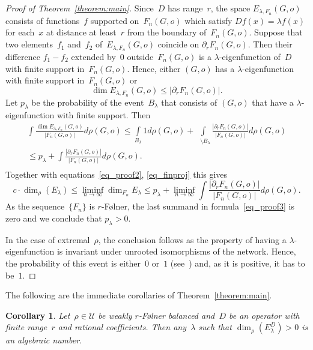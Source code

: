 \documentclass[10pt,a4paper]{amsart}
\newtheorem{corollary}[lemma]{Corollary}
\DeclareMathOperator{\Gr}{{\mathcal{G}_*}}
\begin{document}
\begin{proof}[Proof of Theorem~\ref{theorem:main}]
    Since~$D$ has range~$r$, the space $E_{\lambda, F_n}(G,o)$ consists of functions~$f$ supported on~$F_n(G,o)$ which satisfy $Df(x) = \lambda f(x)$ for each~$x$ at distance at least~$r$ from the boundary of~$F_n(G,o)$. Suppose that two elements~$f_1$ and~$f_2$ of~$E_{\lambda,F_n}(G,o)$ coincide on $\partial_r F_n(G,o)$. Then their difference $f_1 - f_2$ extended by~$0$ outside~$F_n(G,o)$ is a $\lambda$-eigenfunction of~$D$ with finite support in~$F_n(G,o)$. Hence, either $(G,o)$ has a $\lambda$-eigenfunction with finite support in~$F_n(G,o)$ or 
    $$
    \dim {E_{\lambda,F_n}}(G,o) \le |\partial_r F_n(G,o)|.
    $$
    Let $p_\lambda$ be the probability of the event~$B_\lambda$ that consists of $(G,o)$ that have a $\lambda$-eigenfunction with finite support. Then
    \begin{multline*}
      \int\limits_{\Gr} \frac{\dim {E_{\lambda,F_n}}(G,o)}{|F_n(G,o)|} d \rho (G,o) \le 
    \int\limits_{B_\lambda} 1 d \rho (G,o) + 
    \int\limits_{\Gr \setminus B_\lambda} \frac{|\partial_r F_n(G,o)|}{|F_n(G,o)|} d \rho (G,o) \\ \le
    p_\lambda + \int\limits_{\Gr}\frac{|\partial_r F_n(G,o)|}{|F_n(G,o)|} d \rho(G,o).  
    \end{multline*}
    Together with equations~\eqref{eq_proof2}, \eqref{eq_finproj} this gives
    \begin{equation}\label{eq_proof3}
        c \cdot \dim_\rho (E_\lambda) \le 
        \liminf_{n \to \infty}\dim_{F_n} E_\lambda \le p_\lambda + \liminf_{n \to \infty} \int\frac{|\partial_r F_n(G,o)|}{|F_n(G,o)|} d \rho(G,o).
    \end{equation}
    As the sequence~$\{F_n\}$ is $r$-F\o lner, the last summand in formula~\eqref{eq_proof3} is zero and we conclude that $p_\lambda > 0$. 
    
    In the case of extremal~$\rho$, the conclusion follows as the property of having a $\lambda$-eigenfunction is invariant under unrooted isomorphisms of the network. Hence, the probability of this event is either~$0$ or~$1$ (see~\cite{AL07}) and, as it is positive, it has to be~$1$. 
\end{proof}

    The following are the immediate corollaries of Theorem~\ref{theorem:main}. 
    
\begin{corollary}\label{corollary:algebraic}
    Let~$\rho \in \mathcal{U}$ be weakly $r$-{F\o lner} balanced and~$D$ be an  operator with finite range~$r$ and rational coefficients. Then any~$\lambda$ such that $\dim_\rho(E^D_\lambda) > 0$ is an algebraic number. 
\end{corollary}
\end{document}
